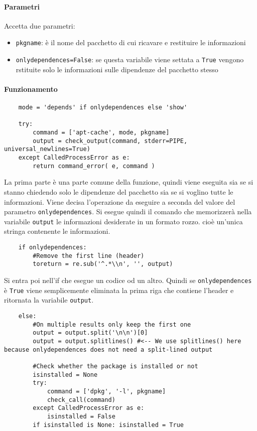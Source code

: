 \documentclass[11pt]{article}
\begin{document}
\paragraph{Parametri}
Accetta due parametri:
\begin{itemize}
	\item{\texttt{pkgname}: è il nome del pacchetto di cui ricavare e restituire le informazioni}
	\item{\texttt{onlydependences=False}: se questa variabile viene settata a \texttt{True} vengono rstituite
		solo le informazioni sulle dipendenze del pacchetto stesso}
\end{itemize}
\paragraph{Funzionamento}
\begin{lstlisting}
    mode = 'depends' if onlydependences else 'show'

    try:
        command = ['apt-cache', mode, pkgname]
        output = check_output(command, stderr=PIPE, universal_newlines=True)
    except CalledProcessError as e:
        return command_error( e, command )
\end{lstlisting}
La prima parte è una parte comune della funzione, quindi viene eseguita sia se si stanno chiedendo solo le dipendenze del pacchetto
sia se si voglino tutte le informazioni. Viene decisa l'operazione da eseguire a seconda del valore del parametro
\texttt{onlydependences}. Si esegue quindi il comando che memorizzerà nella variabile \texttt{output} le informazioni
desiderate in un formato rozzo. cioè un'unica stringa contenente le informazioni.
\begin{lstlisting}
    if onlydependences:
        #Remove the first line (header)
        toreturn = re.sub('^.*\\n', '', output)
\end{lstlisting}
Si entra poi nell'if che esegue un codice od un altro. Quindi se \texttt{onlydependences} è \texttt{True} viene semplicemente
eliminata la prima riga che contiene l'header e ritornata la variabile \texttt{output}.
\begin{lstlisting}
    else:
        #On multiple results only keep the first one
        output = output.split('\n\n')[0]
        output = output.splitlines() #<-- We use splitlines() here because onlydependences does not need a split-lined output

        #Check whether the package is installed or not
        isinstalled = None
        try:
            command = ['dpkg', '-l', pkgname]
            check_call(command)
        except CalledProcessError as e:
            isinstalled = False
        if isinstalled is None: isinstalled = True
\end{lstlisting}
\end{document}
